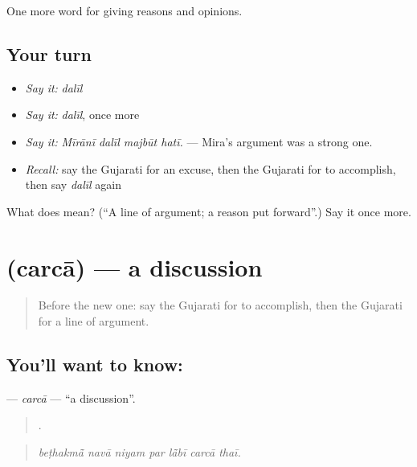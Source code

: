 \begin{grammarlens}[title={What you've built}]
One more word for giving reasons and opinions.
\end{grammarlens}

\subsection*{Your turn}
\begin{itemize}
\raggedright
  \item \emph{Say it:} \emph{dalīl}
  \item \emph{Say it:} \emph{dalīl}, once more
  \item \emph{Say it:} \emph{Mīrānī dalīl majbūt hatī.} — Mira's argument was a strong one.
  \item \emph{Recall:} say the Gujarati for an excuse, then the Gujarati for to accomplish, then say \emph{dalīl} again
\end{itemize}

\begin{tcolorbox}[breakable,colback=teal!4,colframe=teal!35!black,title={Before you move on}]
What does  mean? (\textquotedblleft{}A line of argument; a reason put forward\textquotedblright{}.) Say it once more.
\end{tcolorbox}
\section[\texorpdfstring{\gu{ચર્ચા} (carcā)}{ચર્ચા (carcā)}]{ (carcā) — a discussion}

\label{lesson:GU-C341-carca}



\begin{quote}
Before the new one: say the Gujarati for to accomplish, then the Gujarati for a line of argument.
\end{quote}

\subsection*{You'll want to know: }
\textbf{} — \emph{carcā} — \textquotedblleft{}a discussion\textquotedblright{}.

\begin{quote}
      .
\end{quote}

\begin{quote}
\emph{beṭhakmā̃ navā niyam par lā̃bī carcā thaī.}
\end{quote}

